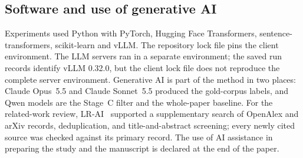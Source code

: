\subsection{Software and use of generative AI}
\label{sec:software}

Experiments used Python with PyTorch, Hugging Face Transformers, sentence-transformers, scikit-learn and vLLM. The repository lock file pins the client environment. The LLM servers ran in a separate environment; the saved run records identify vLLM 0.32.0, but the client lock file does not reproduce the complete server environment. Generative AI is part of the method in two places: Claude Opus~5.5 and Claude Sonnet~5.5 produced the gold-corpus labels, and Qwen models are the Stage~C filter and the whole-paper baseline. For the related-work review, LR-AI~\cite{alnakri2026lrai} supported a supplementary search of OpenAlex and arXiv records, deduplication, and title-and-abstract screening; every newly cited source was checked against its primary record. The use of AI assistance in preparing the study and the manuscript is declared at the end of the paper.
